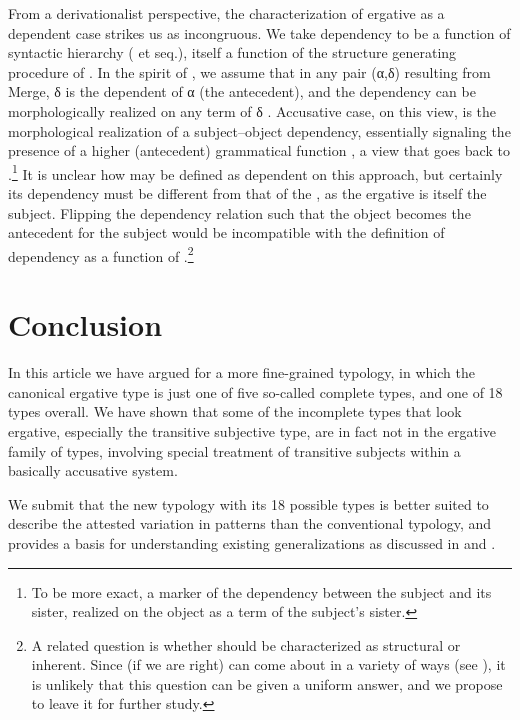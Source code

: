 \documentclass[output=paper]{langsci/langscibook}
\begin{document}
From a derivationalist perspective, the characterization of ergative as a
dependent case strikes us as incongruous. We take dependency to be a function
of syntactic hierarchy (\citealt{Zwart2004} et seq.), itself a function of the
structure generating procedure  of \citet{Chomsky1993}. In the spirit of
\citet{Epstein1999}, we assume that in any pair (α,δ) resulting from Merge, δ
is the dependent of α (the antecedent), and the dependency can be
morphologically realized on any term of δ \citep{Zwart2006b}. Accusative case,
on this view, is the morphological realization of a subject--object dependency,
essentially signaling the presence of a higher (antecedent) grammatical
function \citep{Zwart2006a}, a view that goes back to
\citet{Jakobson1936}.\footnote{To be more exact, a marker of the dependency
between the subject and its sister, realized on the object as a term of the
subject’s sister.\label{fn:29}} It is unclear how  may be defined
as dependent on this approach, but certainly its dependency must be different
from that of the , as the ergative is itself the subject.
Flipping the dependency relation such that the object becomes the antecedent
for the subject would be incompatible with the definition of dependency as a
function of .\footnote{A related question is whether  should
    be characterized as structural or inherent. Since (if we are right)
     can come about in a variety of ways (see
    ), it is unlikely that this question can be given a
uniform answer, and we propose to leave it for further study.\label{fn:30}}

\section{Conclusion}\label{sec:11.7}

In this article we have argued for a more fine-grained  typology, in
which  the canonical ergative  type is just one of five so-called
complete types, and one of 18 types overall. We have shown that some of the
incomplete types that look ergative, especially the transitive subjective type,
are in fact not in the ergative family of types, involving special treatment of
transitive subjects within a basically accusative  system.

We submit that the new  typology with its 18 possible types is better
suited to describe the attested variation in  patterns than the
conventional  typology, and provides a basis for understanding
existing  generalizations as discussed in \citet{Sheehan2014} and
\citet{Deal2015}.
\end{document}
